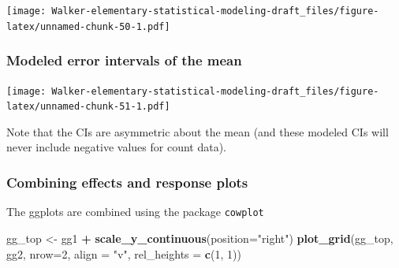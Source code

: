 \documentclass[]{book}
\newenvironment{Shaded}{\begin{snugshade}}{\end{snugshade}}
\newcommand{\KeywordTok}[1]{\textcolor[rgb]{0.13,0.29,0.53}{\textbf{#1}}}
\newcommand{\DataTypeTok}[1]{\textcolor[rgb]{0.13,0.29,0.53}{#1}}
\newcommand{\DecValTok}[1]{\textcolor[rgb]{0.00,0.00,0.81}{#1}}
\newcommand{\FloatTok}[1]{\textcolor[rgb]{0.00,0.00,0.81}{#1}}
\newcommand{\StringTok}[1]{\textcolor[rgb]{0.31,0.60,0.02}{#1}}
\newcommand{\CommentTok}[1]{\textcolor[rgb]{0.56,0.35,0.01}{\textit{#1}}}
\newcommand{\OtherTok}[1]{\textcolor[rgb]{0.56,0.35,0.01}{#1}}
\newcommand{\OperatorTok}[1]{\textcolor[rgb]{0.81,0.36,0.00}{\textbf{#1}}}
\newcommand{\NormalTok}[1]{#1}
\begin{document}
\texttt{[image: Walker-elementary-statistical-modeling-draft\_files/figure-latex/unnamed-chunk-50-1.pdf]}

\subsubsection{Modeled error intervals of the
mean}\label{modeled-error-intervals-of-the-mean}

\begin{Shaded}
\end{Shaded}

\texttt{[image: Walker-elementary-statistical-modeling-draft\_files/figure-latex/unnamed-chunk-51-1.pdf]}

Note that the CIs are asymmetric about the mean (and these modeled CIs
will never include negative values for count data).

\subsubsection{Combining effects and response
plots}\label{combining-effects-and-response-plots}

The ggplots are combined using the package \texttt{cowplot}

\begin{Shaded}
\begin{Highlighting}[]
\NormalTok{gg_top <-}\StringTok{ }\NormalTok{gg1 }\OperatorTok{+}\StringTok{ }\KeywordTok{scale_y_continuous}\NormalTok{(}\DataTypeTok{position=}\StringTok{"right"}\NormalTok{)}
\KeywordTok{plot_grid}\NormalTok{(gg_top, gg2, }\DataTypeTok{nrow=}\DecValTok{2}\NormalTok{, }\DataTypeTok{align =} \StringTok{"v"}\NormalTok{, }\DataTypeTok{rel_heights =} \KeywordTok{c}\NormalTok{(}\DecValTok{1}\NormalTok{, }\DecValTok{1}\NormalTok{))}
\end{Highlighting}
\end{Shaded}
\end{document}
